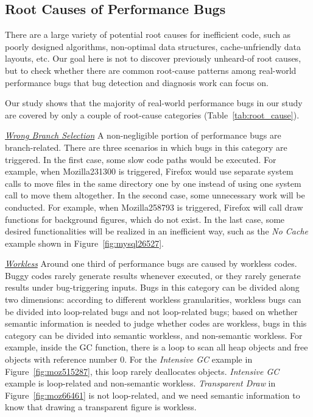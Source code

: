 \subsection{Root Causes of Performance Bugs}
\label{sec:taxonomy_howwaste}

There are a large variety of potential root causes for inefficient code, 
such as poorly designed algorithms, non-optimal data structures, cache-unfriendly data layouts, etc. 
Our goal here is not to discover previously unheard-of root causes, 
but to check whether there are common root-cause patterns among 
real-world performance bugs that bug detection and diagnosis work can focus on.

Our study shows that the majority of real-world performance bugs in our study are covered by only a couple of root-cause categories (Table~\ref{tab:root_cause}).

\underline{\it Wrong Branch Selection} 
A non-negligible portion of performance bugs are branch-related. 
There are three scenarios in which bugs in this category are triggered. 
In the first case, some slow code paths would be executed. 
For example, when Mozilla231300 is triggered, 
Firefox would use separate system calls to move files 
in the same directory one by one instead of using one system call to move them altogether. 
In the second case, some unnecessary work will be conducted. 
For example, when Mozilla258793 is triggered, 
Firefox will call draw functions for background figures, which do not exist. 
In the last case, some desired functionalities will be realized in an inefficient way, 
such as the {\it No Cache} example shown in Figure~\ref{fig:mysql26527}. 

\underline{\it Workless} 
Around one third of performance bugs are caused by workless codes. 
Buggy codes rarely generate results whenever executed, 
or they rarely generate results under bug-triggering inputs. 
Bugs in this category can be divided along two dimensions: 
according to different workless granularities, 
workless bugs can be divided into loop-related bugs and not loop-related bugs; 
based on whether semantic information is needed to judge whether codes are workless, 
bugs in this category can be divided into semantic workless, and non-semantic workless.
For example, inside the GC function, there is a loop to scan all heap objects 
and free objects with reference number 0. 
For the {\it Intensive GC} example in Figure~\ref{fig:moz515287}, this loop rarely deallocates objects. 
{\it Intensive GC} example  is loop-related and non-semantic workless.
{\it Transparent Draw} in Figure~\ref{fig:moz66461} is not loop-related, 
and we need semantic information to know that drawing a transparent figure is workless.

